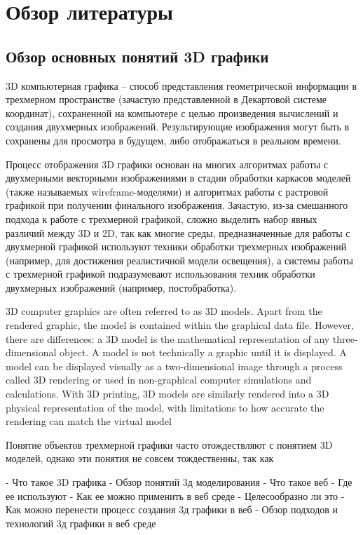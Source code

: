 \section{Обзор литературы}
\label{sec:domain}

\subsection{Обзор основных понятий 3D графики}
\label{sub:domain:overview_3d}
3D компьютерная графика -- способ представления геометрической информации в трехмерном пространстве (зачастую представленной
в Декартовой системе координат), сохраненной на компьютере с целью произведения вычислений и создания двухмерных изображений.
Результирующие изображения могут быть в сохранены для просмотра в будущем, либо отображаться в реальном времени. 

Процесс отображения 3D графики основан на многих алгоритмах работы с двухмерными векторными изображениями в стадии обработки
каркасов моделей (также называемых wireframe-моделями) и алгоритмах работы с растровой графикой при получении финального изображения.
Зачастую, из-за смешанного подхода к работе с трехмерной графикой, сложно выделить набор явных различий между 3D и 2D, так как многие
среды, предназначенные для работы с двухмерной графикой используют техники обработки трехмерных изображений (например, для достижения
реалистичной модели освещения), а системы работы с трехмерной графикой подразумевают использования техник обработки двухмерных изображений
(например, постобработка).

3D computer graphics are often referred to as 3D models. Apart from the rendered graphic, the model is contained within
the graphical data file. However, there are differences: a 3D model is the mathematical representation of any three-dimensional
object. A model is not technically a graphic until it is displayed. A model can be displayed visually as a two-dimensional image
through a process called 3D rendering or used in non-graphical computer simulations and calculations. With 3D printing, 3D models are similarly rendered into a 3D physical representation of the model, with limitations to how accurate the rendering can match the virtual model

Понятие объектов трехмерной графики часто отождествляют с понятием 3D моделей, однако эти понятия не совсем тождественны, так как 


- Что такое 3D графика
- Обзор понятий 3д моделирования
- Что такое веб
- Где ее используют
- Как ее можно применить в веб среде
- Целесообразно ли это
- Как можно перенести процесс создания 3д графики в веб
- Обзор подходов и технологий 3д графики в веб среде